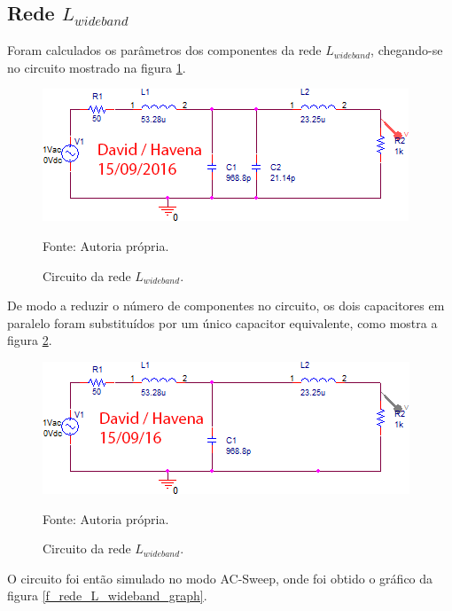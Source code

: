 \subsection{Rede $L_{wideband}$}

Foram calculados os parâmetros dos componentes da rede $L_{wideband}$, chegando-se no circuito mostrado na figura \ref{f_sch_rede_L_wideband}.

\begin{figure}[H]
    \centering
    \caption{Circuito da rede $L_{wideband}$.}
    \includegraphics[scale=0.7]{Imagens/ex2/sch.png}
    \label{f_sch_rede_L_wideband}
    
    \small Fonte: Autoria própria.
\end{figure}

De modo a reduzir o número de componentes no circuito, os dois capacitores em paralelo foram substituídos por um único capacitor equivalente, como mostra a figura \ref{fig:sch2}.

\begin{figure}[H]
    \centering
    \caption{Circuito da rede $L_{wideband}$.}
    \includegraphics[scale=0.7]{Imagens/ex2/sch2.png}
    \label{fig:sch2}
    
    \small Fonte: Autoria própria.
\end{figure}  

O circuito foi então simulado no modo AC-Sweep, onde foi obtido o gráfico da figura \ref{f_rede_L_wideband_graph}.

